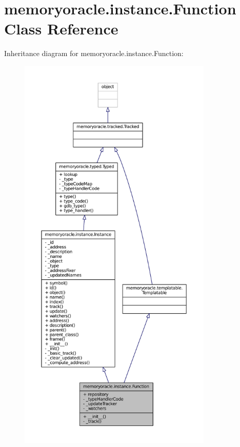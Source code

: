 \hypertarget{classmemoryoracle_1_1instance_1_1Function}{}\section{memoryoracle.\+instance.\+Function Class Reference}
\label{classmemoryoracle_1_1instance_1_1Function}


Inheritance diagram for memoryoracle.\+instance.\+Function\+:\nopagebreak
\begin{figure}[H]
\begin{center}
\leavevmode
\includegraphics[height=550pt]{classmemoryoracle_1_1instance_1_1Function__inherit__graph}
\end{center}
\end{figure}


